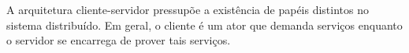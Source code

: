 \quest*{} %
\begin{answer}
    A arquitetura cliente-servidor pressupõe a existência de papéis distintos no sistema distribuído. Em geral, o cliente é um ator que demanda serviços enquanto o servidor se encarrega de prover tais serviços.
\end{answer}

\quest*{} %
\begin{answer}
    
\end{answer}

\quest*{} %
\begin{answer}
    
\end{answer}

\quest*{} %
\begin{answer}
    
\end{answer}

\quest*{} %
\begin{answer}
    
\end{answer}

\quest*{} %
\begin{answer}
    
\end{answer}

\quest*{} %
\begin{answer}
    
\end{answer}

\quest*{} %
\begin{answer}
    
\end{answer}

\quest*{} %
\begin{answer}
    
\end{answer}

\quest*{} %
\begin{answer}
    
\end{answer}

\quest*{} %
\begin{answer}
    
\end{answer}

\quest*{} %
\begin{answer}
    
\end{answer}